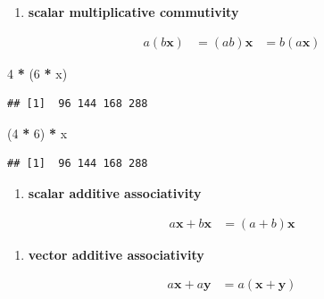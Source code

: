 \documentclass[
]{book}
\newenvironment{Shaded}{\begin{snugshade}}{\end{snugshade}}
\newcommand{\DecValTok}[1]{\textcolor[rgb]{0.00,0.00,0.81}{#1}}
\newcommand{\NormalTok}[1]{#1}
\newcommand{\OperatorTok}[1]{\textcolor[rgb]{0.81,0.36,0.00}{\textbf{#1}}}
\newcommand{\StringTok}[1]{\textcolor[rgb]{0.31,0.60,0.02}{#1}}
\providecommand{\tightlist}{%
  \setlength{\itemsep}{0pt}\setlength{\parskip}{0pt}}
\theoremstyle{definition}
\theoremstyle{definition}
\theoremstyle{definition}
\theoremstyle{remark}
\begin{document}
\begin{enumerate}
\def\labelenumi{\arabic{enumi})}
\setcounter{enumi}{1}
\tightlist
\item
  \textbf{scalar multiplicative commutivity}
\end{enumerate}

\[
\begin{aligned}
a (b \mathbf{x}) & = (ab) \mathbf{x} & = b (a \mathbf{x})
\end{aligned}
\]

\begin{Shaded}
\begin{Highlighting}[]
\DecValTok{4} \OperatorTok{*}\StringTok{ }\NormalTok{(}\DecValTok{6} \OperatorTok{*}\StringTok{ }\NormalTok{x) }
\end{Highlighting}
\end{Shaded}

\begin{verbatim}
## [1]  96 144 168 288
\end{verbatim}

\begin{Shaded}
\begin{Highlighting}[]
\NormalTok{(}\DecValTok{4} \OperatorTok{*}\StringTok{ }\DecValTok{6}\NormalTok{) }\OperatorTok{*}\StringTok{ }\NormalTok{x}
\end{Highlighting}
\end{Shaded}

\begin{verbatim}
## [1]  96 144 168 288
\end{verbatim}

\begin{enumerate}
\def\labelenumi{\arabic{enumi})}
\setcounter{enumi}{2}
\tightlist
\item
  \textbf{scalar additive associativity}
\end{enumerate}

\[
\begin{aligned}
a \mathbf{x} + b \mathbf{x} & = (a + b) \mathbf{x}
\end{aligned}
\]

\begin{enumerate}
\def\labelenumi{\arabic{enumi})}
\setcounter{enumi}{3}
\tightlist
\item
  \textbf{vector additive associativity}
\end{enumerate}

\[
\begin{aligned}
a \mathbf{x} + a \mathbf{y} & = a (\mathbf{x} + \mathbf{y})
\end{aligned}
\]
\end{document}
